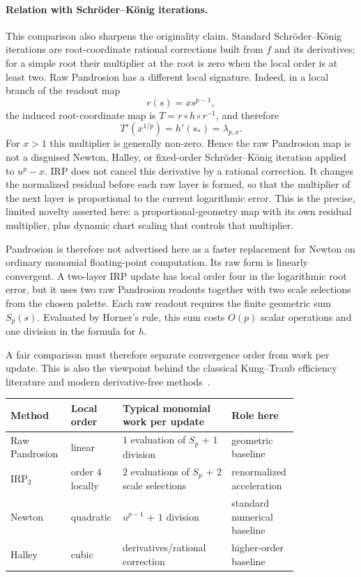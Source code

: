 \documentclass[10pt,a4paper]{article}
\theoremstyle{plain}
\theoremstyle{definition}
\theoremstyle{remark}
\begin{document}
\paragraph{Relation with Schröder--König iterations.}
This comparison also sharpens the originality claim.  Standard Schröder--König
iterations are root-coordinate rational corrections built from $f$ and its
derivatives; for a simple root their multiplier at the root is zero when the
local order is at least two.  Raw Pandrosion has a different local signature.
Indeed, in a local branch of the readout map
\[
  r(s)=x s^{p-1},
\]
the induced root-coordinate map is $T=r\circ h\circ r^{-1}$, and therefore
\[
  T'(x^{1/p})=h'(s_*)=\lambda_{p,x}.
\]
For $x>1$ this multiplier is generally non-zero.  Hence the raw Pandrosion map
is not a disguised Newton, Halley, or fixed-order Schröder--König iteration
applied to $u^p-x$.  IRP does not cancel this derivative by a rational
correction.  It changes the normalized residual before each raw layer is
formed, so that the multiplier of the next layer is proportional to the current
logarithmic error.  This is the precise, limited novelty asserted here: a
proportional-geometry map with its own residual multiplier, plus dynamic chart
scaling that controls that multiplier.

Pandrosion is therefore not advertised here as a faster replacement for Newton
on ordinary monomial floating-point computation.  Its raw form is linearly
convergent.  A two-layer IRP update has local order four in the logarithmic
root error, but it uses two raw Pandrosion readouts together with two scale
selections from the chosen palette.  Each raw readout requires the finite
geometric sum $S_p(s)$.  Evaluated by Horner's rule, this sum costs $O(p)$
scalar operations and one division in the formula for $h$.

A fair comparison must therefore separate convergence order from work per
update.  This is also the viewpoint behind the classical Kung--Traub efficiency
literature and modern derivative-free methods~\cite{kungtraub,petkovic2013,cordero2013,sharma2014}.

\begin{center}
\scriptsize
\begin{tabular}{@{}>{\raggedright\arraybackslash}p{0.20\linewidth}>{\raggedright\arraybackslash}p{0.10\linewidth}>{\raggedright\arraybackslash}p{0.36\linewidth}>{\raggedright\arraybackslash}p{0.16\linewidth}@{}}
\toprule
Method & Local order & Typical monomial work per update & Role here \\
\midrule
Raw Pandrosion & linear & $1$ evaluation of $S_p$ + $1$ division & geometric baseline \\
IRP$_2$ & order $4$ locally & $2$ evaluations of $S_p$ + $2$ scale selections & renormalized acceleration \\
Newton & quadratic & $u^{p-1}$ + $1$ division & standard numerical baseline \\
Halley & cubic & derivatives/rational correction & higher-order baseline \\
\bottomrule
\end{tabular}
\end{center}
\end{document}

